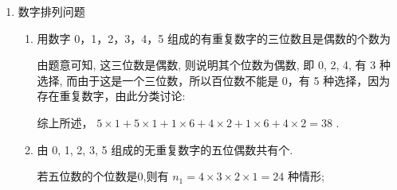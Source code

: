 \begin{enumerate}
\begin{enumerate}
\begin{jieda}
            对于每一条面对角线，都与一个对角面构成“正交线面对”，这样的“正交线面对”有 12 个
            
            不存在四个顶点确定的平面与体对角线垂直，
            
            所以正方体中“正交线面对”共有 ${24} + {12} = {36}$ 个.
        \end{jieda}
        
        
    \end{enumerate}
    
    \item 数字排列问题

    \begin{enumerate}
        \item 用数字 0，1，2，3，4，5 组成的有重复数字的三位数且是偶数的个数为
        \begin{jieda}
            由题意可知, 这三位数是偶数, 则说明其个位数为偶数, 即 0, 2, 4, 有 3 种选择, 而由于这是一个三位数，所以百位数不能是 0，有 5 种选择，因为存在重复数字，由此分类讨论:  
            综上所述， $5 \times  1 + 5 \times  1 + 1 \times  6 + 4 \times  2 + 1 \times  6 + 4 \times  2 = {38}$ .
        \end{jieda}
        
        \item 由 0, 1, 2, 3, 5 组成的无重复数字的五位偶数共有个.
        \begin{jieda}
            若五位数的个位数是0,则有 ${n}_{1} = 4 \times  3 \times  2 \times  1 = {24}$ 种情形;
            

\end{jieda}
\end{enumerate}
\end{enumerate}
